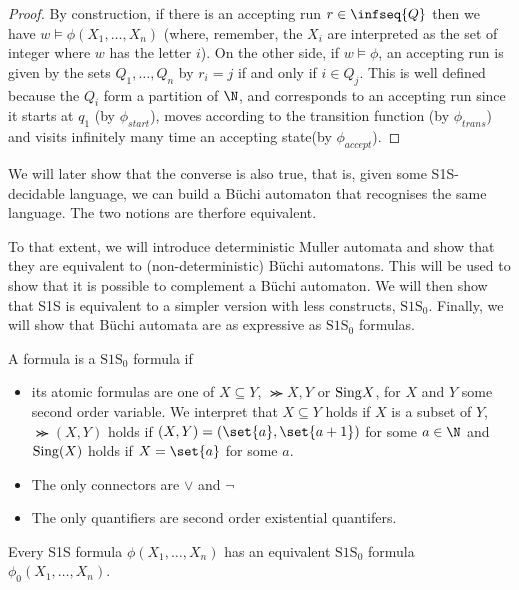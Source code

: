 \begin{proof}
    By construction, if there is an accepting run $r \in \infseq{Q}$
    then we have $w \models \phi(X_1, \dots, X_n)$ (where, remember, the $X_i$
    are interpreted as the set of integer where $w$ has the letter $i$).
    On the other side, if $w \models \phi$, an accepting run
    is given by the sets $Q_1, \dots, Q_{n}$ by $r_i = j$
    if and only if $i \in Q_j$. This is well defined because the $Q_i$
    form a partition of $\N$, and corresponds to an accepting run
    since it starts at $q_1$ (by $\phi_{start}$),
    moves according to the transition function (by $\phi_{trans}$)
    and visits infinitely many time an accepting state(by $\phi_{accept}$).
\end{proof}

We will later show that the converse is also true,
that is, given some S1S-decidable language,
we can build a Büchi automaton that recognises the same
language. The two notions are therfore equivalent.

To that extent, we will introduce deterministic Muller
automata and show that they are equivalent to (non-deterministic)
Büchi automatons. This will be used to show
that it is possible to complement a Büchi automaton.
We will then show that S1S is equivalent
to a simpler version with less constructs, $\text{S1S}_0$.
Finally, we will show that Büchi automata are as expressive
as $\text{S1S}_0$ formulas.


\begin{definition}
    A formula is a $\text{S1S}_0$ formula if
    \begin{itemize}
        \item its atomic formulas are one of $X \subseteq Y$,
            $\Succ{X, Y}$ or $\mathrm{Sing}{X}$, for $X$ and $Y$ some second
            order variable. We interpret that $X \subseteq Y$ holds
            if $X$ is a subset of $Y$, $\Succ(X, Y)$ holds if
            $(X, Y) = (\set{a}, \set{a+1})$ for some $a \in \N$ and
            $\mathrm{Sing}(X)$ holds if $X = \set{a}$ for some $a$.
        \item The only connectors are $\vee$ and $\neg$
        \item The only quantifiers are second order existential quantifers.
    \end{itemize}
\end{definition}

\begin{lemma}
    \label{lemma:s1s-is-s1s-0}
    Every S1S formula $\phi(X_1, \dots, X_n)$ has
    an equivalent $\text{S1S}_0$ formula $\phi_0(X_1, \dots, X_n)$.
\end{lemma}

